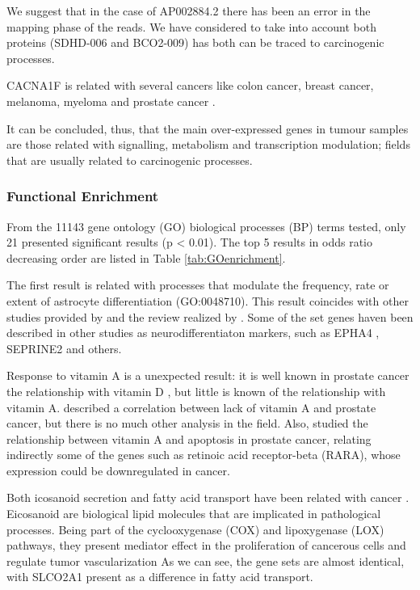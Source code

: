 \documentclass[9pt,twocolumn,twoside]{gsajnl}
\begin{document}
We suggest that in the case of AP002884.2 there has been an error in the mapping phase of the reads. We have considered to take into account both proteins (SDHD-006 and BCO2-009) has both can be traced to carcinogenic processes.

CACNA1F is related with several cancers like colon cancer, breast cancer, melanoma, myeloma and prostate cancer \citep{tcng}.


It can be concluded, thus, that the main over-expressed genes in tumour samples are those related with signalling, metabolism and transcription modulation; fields that are usually related to carcinogenic processes.

\subsubsection*{Functional Enrichment}

From the 11143 gene ontology (GO) biological processes (BP) terms tested, only 21 presented significant results (p < 0.01). The top 5 results in odds ratio decreasing order are listed in Table \ref{tab:GOenrichment}.

The first result is related with processes that modulate the frequency, rate or extent of astrocyte differentiation (GO:0048710). This result coincides with other studies provided by \cite{neuroendocrine3, neuroendocrine2} and the review realized by \cite{neuroendocrine1}. Some of the set genes haven been described in other studies as neurodifferentiaton markers, such as EPHA4 \cite{neuroendocrine_EPA}, SEPRINE2 \cite{mckee2013protease} and others.

Response to vitamin A is a unexpected result: it is well known in prostate cancer the relationship with vitamin D \citep{vitamin0,vitamind1,vitamind2,vitamind3}, but little is known of the relationship with vitamin A. \cite{vitamina1} described a correlation between lack of vitamin A and prostate cancer, but there is no much other analysis in the field. Also, \cite{vitamina2} studied the relationship between vitamin A and apoptosis in prostate cancer, relating indirectly some of the genes such as retinoic acid receptor-beta (RARA), whose expression could be downregulated in cancer.

Both icosanoid secretion and fatty acid transport have been related with cancer \citep{fat1,fat2}. Eicosanoid are biological lipid molecules that are implicated in pathological processes. Being part of the  cyclooxygenase (COX) and lipoxygenase (LOX) pathways, they present mediator effect in the proliferation of cancerous cells and regulate tumor vascularization \citep{fatvascu} As we can see, the gene sets are almost identical, with SLCO2A1 present as a difference in fatty acid transport.
\end{document}
